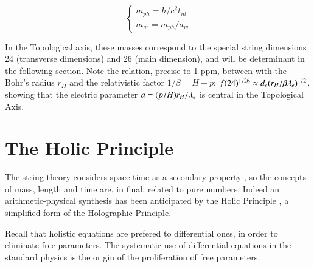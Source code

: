 \documentclass[a4paper,9pt]{article}
\begin{document}
\begin{equation}
 \left\{
    \begin{array}{ll}
        m_{ph} = \hbar/c^2t_{nl}\\
        m_{gr} =m_{ph}/a_w
    \end{array}
\right.
\end{equation}

In the Topological axis, these masses correspond to the special string dimensions 24 (transverse dimensions) and 26 (main dimension), and will be determinant in the following section. Note the relation, precise to 1 ppm, between with the Bohr's radius $r_H$  and the relativistic factor $1/\beta = H-p$: $f(24)^{1/26} \approx d_e (r_H/\beta\lambdabar_e)^{1/2}$, showing that the electric parameter $a = (p/H)r_H/\lambdabar_e$ is central in the Topological Axis.

%






 
 
 
\section{The Holic Principle}

The string theory considers space-time as a secondary property \cite{Seiberg}, so the concepts of mass, length and time are, in final, related to pure numbers. Indeed an arithmetic-physical synthesis has been anticipated by the Holic Principle  \cite{Sanchez1}, a simplified form of the Holographic Principle. 

Recall that holistic equations are prefered to differential ones, in order to eliminate free parameters. 
The systematic use of differential equations in the standard physics is the origin of the proliferation of free parameters. 
\end{document}
